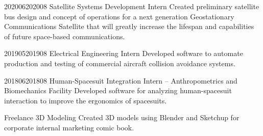 \documentclass[letterpaper,ddMMMyyyy,nonstopmode]{simpleresumecv}
\begin{document}
\begin{Body}
            





                {2020}{06}{2020}{08}
                {Satellite Systems Development Intern}
                {Created preliminary satellite bus design and concept of operations 
                for a next generation Geostationary Communications Satellite that will greatly increase the 
                lifespan and capabilities of future space-based communications. }

                {2019}{05}{2019}{08}
                {Electrical Engineering Intern}
                {Developed software to automate production and testing of commercial aircraft
                    collision avoidance systems.}

                {2018}{06}{2018}{08}
                {Human-Spacesuit Integration Intern -- Anthropometrics and Biomechanics Facility}
                {Developed software for analyzing human-spacesuit interaction to improve the ergonomics
                    of spacesuits.}

                {Freelance 3D Modeling}
                {Created 3D models using Blender and Sketchup for corporate
                    internal marketing comic book.}



		\Gap
            \begin{skillTable}
                \\


\end{skillTable}
\end{Body}
\end{document}
